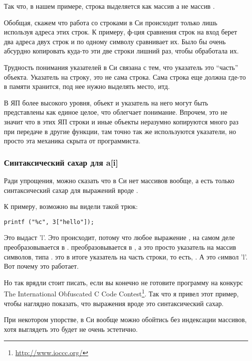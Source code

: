 Так что, в нашем примере, строка выделяется как массив  а не массив .

Обобщая, скажем что работа со строками в Си происходит только лишь используя адреса этих строк. К примеру,
ф-ция сравнения строк  на вход берет два адреса двух строк и по одному символу сравнивает их.
Было бы очень абсурдно копировать куда-то эти две строки лишний раз, чтобы  обработала их.

Трудность понимания указателей в Си связана с тем, что указатель это ``часть'' объекта. Указатель на строку,
это не сама строка. Сама строка еще должна где-то в памяти хранится, под нее нужно выделять место, итд.

В ЯП более высокого уровня, объект и указатель на него могут быть представлены как единое целое, что облегчает
понимание.
Впрочем, это не значит что в этих ЯП строки и иные объекты неразумно копируются много раз при передаче 
в другие функции,
там точно так же используются указатели, но просто эта механика скрыта от программиста.

\subsubsection{Синтаксический сахар для a[i]}

Ради упрощения, можно сказать что в Си нет массивов вообще, а есть только синтаксический сахар для выражений
вроде .

К примеру, возможно вы видели такой трюк:

\begin{lstlisting}
printf ("%c", 3["hello"]);
\end{lstlisting}

Это выдаст 'l'. 
Это происходит, потому что любое выражение , на самом деле преобразовывается в 
\cite[6.5.2.1]{C99TC3}.
 преобразовывается в , а  это просто указатель на массив символов, 
типа .
 это в итоге указатель на часть строки, то есть, . А  это cимвол 'l'. 
Вот почему это работает.

Но так врядли стоит писать, если вы конечно не готовите программу на конкурс 
The International Obfuscated C Code Contest\footnote{\url{http://www.ioccc.org/}}.
Так что я привел этот пример, чтобы наглядно показать, 
что выражения вроде  это синтаксический сахар.

При некотором упорстве, в Си вообще можно обойтись без индексации массивов, хотя выглядеть это будет не очень
эстетично.

